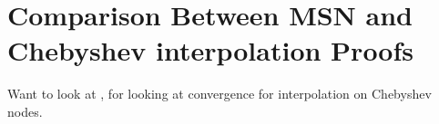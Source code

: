 \section{Comparison Between MSN and Chebyshev interpolation Proofs}
\label{sec:cvip_comparison}

Want to look at \cite[Page 96]{boyd2001chebyshev}, \cite{ATAP} for
looking at convergence for interpolation on Chebyshev nodes.

